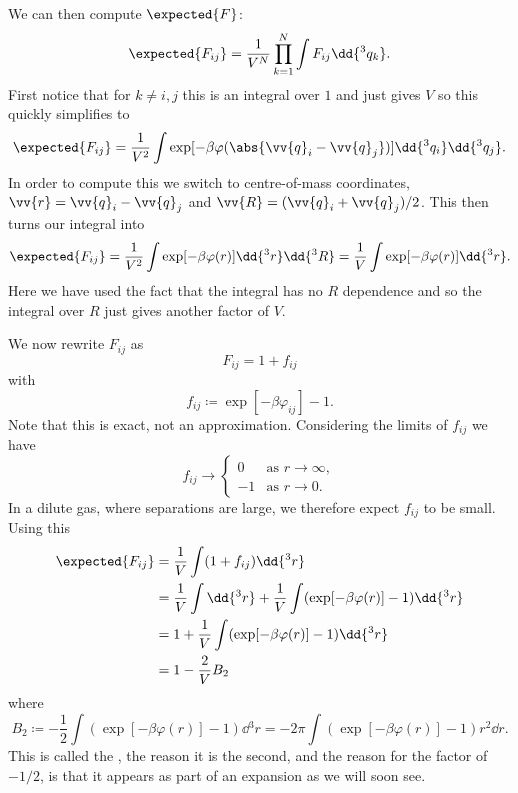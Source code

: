 \documentclass[fleqn]{NotesClass}
\begin{document}
    We can then compute \(\expected{F}\):
    \begin{equation}
        \expected{F_{ij}} = \frac{1}{V^N} \prod_{k = 1}^{N} \int F_{ij} \dd{^3 q_k}.
    \end{equation}
    First notice that for \(k \ne i, j\) this is an integral over \(1\) and just gives \(V\) so this quickly simplifies to
    \begin{equation}
        \expected{F_{ij}} = \frac{1}{V^2} \int \exp[-\beta \varphi(\abs{\vv{q}_i - \vv{q}_j})] \dd{^3q_i} \dd{^3q_j}.
    \end{equation}
    In order to compute this we switch to centre-of-mass coordinates, \(\vv{r} = \vv{q}_i - \vv{q}_j\) and \(\vv{R} = (\vv{q}_i + \vv{q}_j)/2\).
    This then turns our integral into
    \begin{equation}
        \expected{F_{ij}} = \frac{1}{V^2} \int \exp[-\beta \varphi(r)] \dd{^3r}\dd{^3R} = \frac{1}{V} \int \exp[-\beta \varphi(r)] \dd{^3r}.
    \end{equation}
    Here we have used the fact that the integral has no \(R\) dependence and so the integral over \(R\) just gives another factor of \(V\).
    
    We now rewrite \(F_{ij}\) as
    \begin{equation}
        F_{ij} = 1 + f_{ij}
    \end{equation}
    with
    \begin{equation}
        f_{ij} \coloneqq \exp[-\beta \varphi_{ij}] - 1.
    \end{equation}
    Note that this is exact, not an approximation.
    Considering the limits of \(f_{ij}\) we have
    \begin{equation}
        f_{ij} \to
        \begin{cases}
            0 & \text{as } r \to \infty,\\
            -1 & \text{as } r \to 0. 
        \end{cases}
    \end{equation}
    In a dilute gas, where separations are large, we therefore expect \(f_{ij}\) to be small.
    Using this
    \begin{align}
        \expected{F_{ij}} &= \frac{1}{V} \int (1 + f_{ij}) \dd{^3r}\\
        &= \frac{1}{V} \int \dd{^3r} + \frac{1}{V}\int (\exp[-\beta \varphi(r)] - 1) \dd{^3r}\\
        &= 1 + \frac{1}{V} \int (\exp[-\beta\varphi(r)] - 1) \dd{^3 r}\\
        &= 1 - \frac{2}{V}B_2
    \end{align}
    where
    \begin{equation}
        B_2 \coloneqq -\frac{1}{2} \int (\exp[-\beta \varphi(r)] - 1) \dd{^3r} = -2\pi \int (\exp[-\beta\varphi(r)] - 1)r^2 \dd{r}.
    \end{equation}
    This is called the , the reason it is the second, and the reason for the factor of \(-1/2\), is that it appears as part of an expansion as we will soon see.
    
\end{document}
